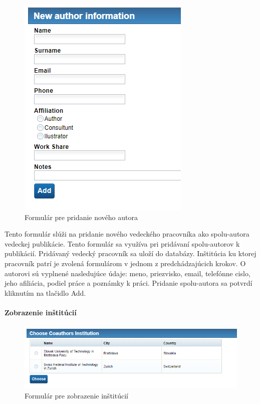 \documentclass[10pt,oneside,slovak,a4paper]{article}
\begin{document}
\begin{figure} [H]
\centering
\includegraphics[scale=0.4]{forms/Coachforaddingnewauthor.png} 
\caption{Formulár pre pridanie nového autora}
\end{figure}

Tento formulár slúži na pridanie nového vedeckého pracovníka ako spolu-autora vedeckej publikácie. Tento formulár sa využíva pri pridávaní spolu-autorov k publikácií. Pridávaný vedecký pracovník sa uloží do databázy. Inštitúcia ku ktorej pracovník patrí je zvolená formulárom v jednom z predchádzajúcich krokov. O autorovi sú vyplnené nasledujúce údaje: meno, priezvisko, email, telefónne cislo, jeho afiliácia, podiel práce a poznámky k práci. Pridanie spolu-autora sa potvrdí kliknutím na tlačidlo Add.

\paragraph{Zobrazenie inštitúcií}

\begin{figure} [H]
\centering
\includegraphics[scale=0.4]{forms/CoachforDisplayInstitutions.png} 
\caption{Formulár pre zobrazenie inštitúcií}
\end{figure}
\end{document}
